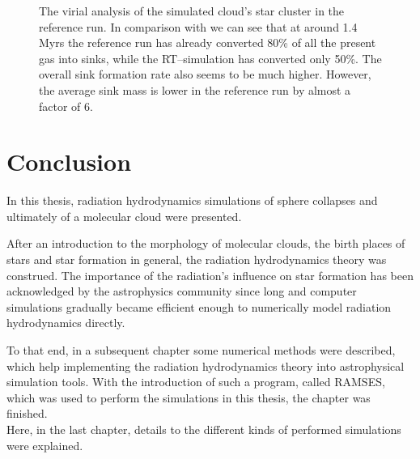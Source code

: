 \begin{figure}[!htb]
 \captionsetup{justification=justified,singlelinecheck=false,width=\linewidth}
 \decoRule
 \caption[Reference run's virial analysis]{The virial analysis of the simulated cloud's star cluster in the reference run.
                                           In comparison with  we can see that at around 1.4 Myrs the reference run has already converted 80\% of all the present gas into sinks, while the RT--simulation has converted only 50\%.
                                           The overall sink formation rate also seems to be much higher.
                                           However, the average sink mass is lower in the reference run by almost a factor of 6.}
 \label{fig:Cluster_HDvirial}
\end{figure}
\FloatBarrier


\section{Conclusion}
\label{sec:Conclusion}


In this thesis, radiation hydrodynamics simulations of sphere collapses and ultimately of a molecular cloud were presented.

After an introduction to the morphology of molecular clouds, the birth places of stars and star formation in general, the radiation hydrodynamics theory was construed.
The importance of the radiation's influence on star formation has been acknowledged by the astrophysics community since long and computer simulations gradually became efficient enough to numerically model radiation hydrodynamics directly.

To that end, in a subsequent chapter some numerical methods were described, which help implementing the radiation hydrodynamics theory into astrophysical simulation tools.
With the introduction of such a program, called RAMSES, which was used to perform the simulations in this thesis, the chapter was finished.
\\[6pt]
%
Here, in the last chapter, details to the different kinds of performed simulations were explained.

